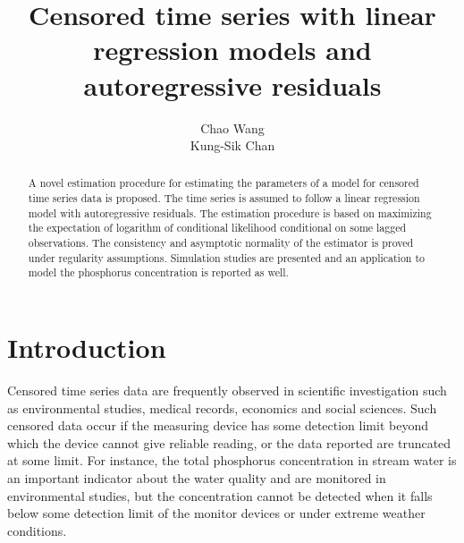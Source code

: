 \documentclass[a4paper,12pt]{article}
\title{Censored time series with linear regression models and  autoregressive residuals}
\author{Chao Wang\\ Kung-Sik Chan}
\begin{document}
\maketitle
\begin{abstract}
A novel estimation procedure for estimating the parameters of a model for censored time series data is proposed.
The time series is assumed to follow a linear regression model with autoregressive residuals. The estimation procedure is based on maximizing the expectation of logarithm of conditional likelihood conditional on some lagged observations. The consistency and asymptotic normality of the estimator is proved under regularity assumptions. Simulation studies are presented and an application to model the phosphorus concentration is reported as well.

\end{abstract}

\newpage

\section{Introduction}

Censored time series data are frequently observed in scientific investigation such as environmental studies, medical records, economics and social sciences. Such censored data occur if the measuring device has some detection limit beyond which the device cannot give reliable reading, or the data reported are truncated at some limit. For instance, the total phosphorus concentration in stream water is an important indicator about the water quality and are monitored in environmental studies, but the concentration cannot be detected when it falls below some detection limit of the monitor devices or under extreme weather conditions.
\end{document}
